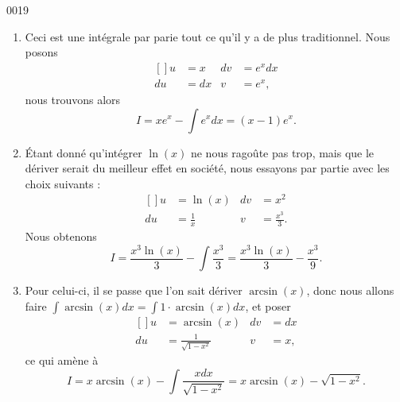 \begin{corrige}{0019}

\begin{enumerate}

\item
Ceci est une intégrale par parie tout ce qu'il y a de plus traditionnel. Nous posons
\begin{equation}
	\begin{aligned}[]
		u&=x	&	dv&= e^{x}dx\\
		du&=dx	&	v&=e^x,
	\end{aligned}
\end{equation}
nous trouvons alors
\begin{equation}
	I=xe^x-\int e^{x}dx=(x-1)e^x.
\end{equation}

\item
Étant donné qu'intégrer $\ln(x)$ ne nous ragoûte pas trop, mais que le dériver serait du meilleur effet en société, nous essayons par partie avec les choix suivants :
\begin{equation}
	\begin{aligned}[]
		u&=\ln(x)		&	dv&=x^2\\
		du&=\frac{1}{ x }	&	v&=\frac{ x^3 }{ 3 }.
	\end{aligned}
\end{equation}
Nous obtenons
\begin{equation}
	I=\frac{ x^3\ln(x) }{ 3 }-\int\frac{ x^3 }{ 3 }=\frac{ x^3\ln(x) }{ 3 }-\frac{ x^3 }{ 9 }.
\end{equation}

\item
Pour celui-ci, il se passe que l'on sait dériver $\arcsin(x)$, donc nous allons faire $\int\arcsin(x)dx=\int 1\cdot\arcsin(x)dx$, et poser
\begin{equation}
	\begin{aligned}[]
		u&=\arcsin(x)		&	dv&=dx\\
		du&=\frac{1}{ \sqrt{1-x^2} }	&	v&=x,
	\end{aligned}
\end{equation}
ce qui amène à
\begin{equation}
	I=x\arcsin(x)-\int\frac{ xdx }{ \sqrt{1-x^2} }=x\arcsin(x)-\sqrt{1-x^2}.
\end{equation}


\end{enumerate}
\end{corrige}
